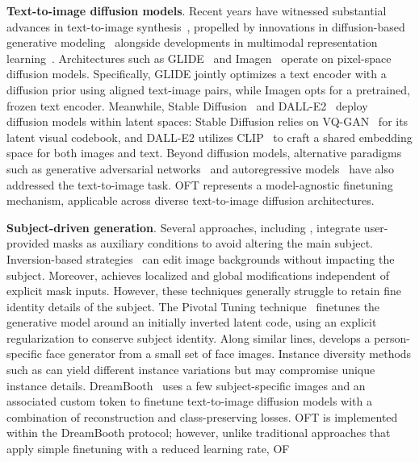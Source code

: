 \textbf{Text-to-image diffusion models}. Recent years have witnessed substantial advances in text-to-image synthesis~\cite{saharia2022photorealistic,ramesh2022hierarchical,rombach2022high,gu2022vector,nichol2022glide}, propelled by innovations in diffusion-based generative modeling~\cite{ho2020denoising,song2021score,song2021denoising,dhariwal2021diffusion} alongside developments in multimodal representation learning~\cite{su2020vlbert,lu2019vilbert,radford2021learning,wang2021simvlm,li2022blip,li2023blip,alayrac2022flamingo,schuhmann2022laion}. Architectures such as GLIDE~\cite{nichol2022glide} and Imagen~\cite{saharia2022photorealistic} operate on pixel-space diffusion models. Specifically, GLIDE jointly optimizes a text encoder with a diffusion prior using aligned text-image pairs, while Imagen opts for a pretrained, frozen text encoder. Meanwhile, Stable Diffusion~\cite{rombach2022high} and DALL-E2~\cite{ramesh2022hierarchical} deploy diffusion models within latent spaces: Stable Diffusion relies on VQ-GAN~\cite{esser2021taming} for its latent visual codebook, and DALL-E2 utilizes CLIP~\cite{radford2021learning} to craft a shared embedding space for both images and text. Beyond diffusion models, alternative paradigms such as generative adversarial networks~\cite{reed2016generative,zhang2017stackgan,xu2018attngan,li2019controllable} and autoregressive models~\cite{ramesh2021zero,ding2021cogview,wu2022nuwa,yuscaling} have also addressed the text-to-image task. OFT represents a model-agnostic finetuning mechanism, applicable across diverse text-to-image diffusion architectures.

\textbf{Subject-driven generation}. Several approaches, including \cite{avrahami2022blended,nichol2022glide}, integrate user-provided masks as auxiliary conditions to avoid altering the main subject. Inversion-based strategies~\cite{choi2021ilvr,dhariwal2021diffusion,ramesh2022hierarchical,gal2022image} can edit image backgrounds without impacting the subject. Moreover, \cite{hertz2022prompt} achieves localized and global modifications independent of explicit mask inputs. However, these techniques generally struggle to retain fine identity details of the subject. The Pivotal Tuning technique~\cite{roich2022pivotal} finetunes the generative model around an initially inverted latent code, using an explicit regularization to conserve subject identity. Along similar lines, \cite{nitzan2022mystyle} develops a person-specific face generator from a small set of face images. Instance diversity methods such as \cite{casanova2021instance} can yield different instance variations but may compromise unique instance details. DreamBooth~\cite{ruiz2023dreambooth} uses a few subject-specific images and an associated custom token to finetune text-to-image diffusion models with a combination of reconstruction and class-preserving losses. OFT is implemented within the DreamBooth protocol; however, unlike traditional approaches that apply simple finetuning with a reduced learning rate, OF


